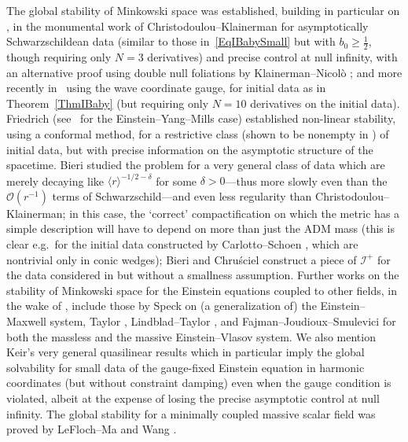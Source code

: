 \documentclass[reqno,11pt,letterpaper]{amsart}
\numberwithin{equation}{section}
\numberwithin{figure}{section}
\theoremstyle{definition}
\theoremstyle{remark}
\newcommand{\mc}{\mathcal}
\newcommand{\cO}{\mc O}
\newcommand{\ms}{\mathscr}
\newcommand{\scri}{\ms I}
\newcommand{\la}{\langle}
\newcommand{\ra}{\rangle}
\newcommand{\half}{\tfrac{1}{2}}
\begin{document}
The global stability of Minkowski space was established, building in particular on \cite{KlainermanNullCondition,ChristodoulouGlobalSolutionsSmallData}, in the monumental work of Christodoulou--Klainerman \cite{ChristodoulouKlainermanStability} for asymptotically Schwarzschildean data (similar to those in~\eqref{EqIBabySmall} but with $b_0\geq\half$, though requiring only $N=3$ derivatives) and precise control at null infinity, with an alternative proof using double null foliations by Klainerman--Nicol\`o \cite{KlainermanNicoloEvolution}; and more recently in~\cite{LindbladRodnianskiGlobalExistence,LindbladRodnianskiGlobalStability} using the wave coordinate gauge, for initial data as in Theorem~\ref{ThmIBaby} (but requiring only $N=10$ derivatives on the initial data). Friedrich \cite{FriedrichStability} (see~\cite{FriedrichEinsteinMaxwellYangMills} for the Einstein--Yang--Mills case) established non-linear stability, using a conformal method, for a restrictive class (shown to be nonempty in \cite{CorvinoScalar}) of initial data, but with precise information on the asymptotic structure of the spacetime. Bieri \cite{BieriZipserStability} studied the problem for a very general class of data which are merely decaying like $\la r\ra^{-1/2-\delta}$ for some $\delta>0$---thus more slowly even than the $\cO(r^{-1})$ terms of Schwarzschild---and even less regularity than Christodoulou--Klainerman; in this case, the `correct' compactification on which the metric has a simple description will have to depend on more than just the ADM mass (this is clear e.g.\ for the initial data constructed by Carlotto--Schoen \cite{CarlottoSchoenData}, which are nontrivial only in conic wedges); Bieri and Chru\'sciel \cite{BieriChruscielADMBondi,ChruscielScriPiece} construct a piece of $\scri^+$ for the data considered in \cite{BieriZipserStability} but without a smallness assumption. Further works on the stability of Minkowski space for the Einstein equations coupled to other fields, in the wake of \cite{ChristodoulouKlainermanStability,LindbladRodnianskiGlobalExistence,LindbladRodnianskiGlobalStability}, include those by Speck \cite{SpeckEinsteinMaxwell} on (a generalization of) the Einstein--Maxwell system, Taylor \cite{TaylorEinsteinVlasov}, Lindblad--Taylor \cite{LindbladTaylorVlasov}, and Fajman--Joudioux--Smulevici \cite{FajmanJoudiouxSmuleviciEinsteinVlasov} for both the massless and the massive Einstein--Vlasov system. We also mention Keir's very general quasilinear results \cite{KeirWeak} which in particular imply the global solvability for small data of the gauge-fixed Einstein equation in harmonic coordinates (but without constraint damping) even when the gauge condition is violated, albeit at the expense of losing the precise asymptotic control at null infinity. The global stability for a minimally coupled massive scalar field was proved by LeFloch--Ma \cite{LeFlochMaEinsteinMassive} and Wang \cite{WangEinsteinKleinGordon}.
\end{document}
